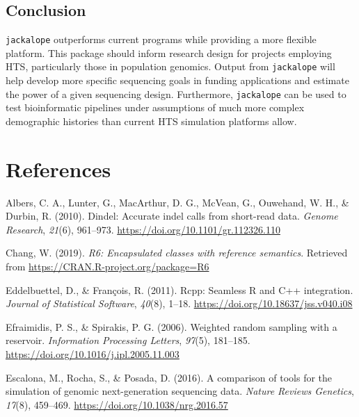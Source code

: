 \documentclass[12pt,]{article}
\begin{document}
\hypertarget{conclusion}{%
\subsection{Conclusion}\label{conclusion}}

\texttt{jackalope} outperforms current programs while providing a more
flexible platform. This package should inform research design for
projects employing HTS, particularly those in population genomics.
Output from \texttt{jackalope} will help develop more specific
sequencing goals in funding applications and estimate the power of a
given sequencing design. Furthermore, \texttt{jackalope} can be used to
test bioinformatic pipelines under assumptions of much more complex
demographic histories than current HTS simulation platforms allow.

\hypertarget{references}{%
\section*{References}\label{references}}

\hypertarget{refs}{}
\leavevmode\hypertarget{ref-Albers_2010}{}%
Albers, C. A., Lunter, G., MacArthur, D. G., McVean, G., Ouwehand, W.
H., \& Durbin, R. (2010). Dindel: Accurate indel calls from short-read
data. \emph{Genome Research}, \emph{21}(6), 961--973.
\url{https://doi.org/10.1101/gr.112326.110}

\leavevmode\hypertarget{ref-Chang_2019}{}%
Chang, W. (2019). \emph{R6: Encapsulated classes with reference
semantics}. Retrieved from \url{https://CRAN.R-project.org/package=R6}

\leavevmode\hypertarget{ref-Eddelbuettel_2011}{}%
Eddelbuettel, D., \& François, R. (2011). Rcpp: Seamless R and C++
integration. \emph{Journal of Statistical Software}, \emph{40}(8),
1--18. \url{https://doi.org/10.18637/jss.v040.i08}

\leavevmode\hypertarget{ref-Efraimidis_2006}{}%
Efraimidis, P. S., \& Spirakis, P. G. (2006). Weighted random sampling
with a reservoir. \emph{Information Processing Letters}, \emph{97}(5),
181--185. \url{https://doi.org/10.1016/j.ipl.2005.11.003}

\leavevmode\hypertarget{ref-Escalona_2016}{}%
Escalona, M., Rocha, S., \& Posada, D. (2016). A comparison of tools for
the simulation of genomic next-generation sequencing data. \emph{Nature
Reviews Genetics}, \emph{17}(8), 459--469.
\url{https://doi.org/10.1038/nrg.2016.57}
\end{document}

